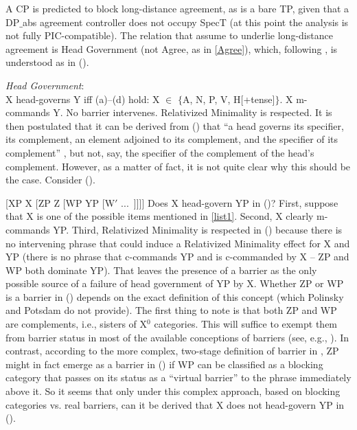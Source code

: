 \documentclass[output=paper
,modfonts
,nonflat]{langsci/langscibook}
\begin{document}
 A CP is predicted to block long-distance agreement, as is a bare TP,
 given that a DP$\_${abs} agreement controller does not occupy SpecT (at
 this point the analysis is not fully PIC-compatible). The relation
 that \cite{Polinsky&Potsdam:01} assume to underlie long-distance
 agreement is  Head Government (not Agree, as in \ref{Agree}),
 which, following \cite{Rizzi:90}, is understood as in (\Next).

\ea\label{ex:mueller:11} {\itshape Head Government}:\\
X head-governs Y iff (a)--(d) hold:
\ea \label{list1}X $\in$ $\{$A, N, P, V, H[+{\rm tense}]$\}$.
\ex X m-commands Y.
\ex No barrier intervenes.
\ex Relativized Minimality is respected. 
\z
\z
It is then postulated that it can be derived from (\Last) that ``a head
governs its specifier, its complement, an element adjoined to its
complement, and the specifier of its complement''
\citep[627]{Polinsky&Potsdam:01}, but not, say, the specifier of
the complement of the head's complement. However, as a matter of fact,
  it is not quite clear why this should be the case. Consider (\Next).

\ea\label{ex:mueller:12} [XP X [ZP \label{vcp}Z [WP YP [W$'$ ...~]]]] \z
Does X head-govern YP in (\Last)? First, suppose that X is one of the
possible items mentioned in \ref{list1}. Second, X clearly m-commands
YP. Third, Relativized Minimality is respected in (\Last) because there
is no intervening phrase that could induce a Relativized Minimality
effect for X and YP (there is no phrase that c-commands YP and is
c-commanded by X -- ZP and WP both dominate YP). That leaves the
presence of a barrier as the only possible source of a failure of
head government of YP by X. Whether ZP or WP is a barrier in (\Last)
depends on the exact definition of this concept (which Polinsky and
Potsdam do not provide). The first thing to note is that both ZP and
WP are complements, i.e., sisters of X$^0$ categories. This will
suffice to exempt them from barrier status in most of the available
conceptions of barriers (see, e.g., \cite{Cinque:90}). In contrast,
according to the more complex, two-stage definition of barrier in
\cite{Chomsky:86}, ZP might in fact emerge as a barrier in (\Last) if WP
can be classified as a blocking category that passes on its status as
a ``virtual barrier'' to the phrase immediately above it. So it seems
that only under this complex approach, based on blocking categories
vs. real barriers, can it be derived that X does not head-govern YP in
(\Last). 
\end{document}
